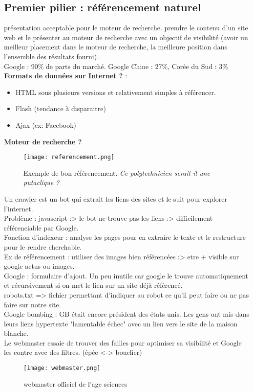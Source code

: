\documentclass[10pt,a4paper]{article}
\begin{document}
\subsection{Premier pilier : référencement naturel}
présentation acceptable pour le moteur de recherche.
prendre le contenu d'un site web et le présenter au moteur de recherche avec un objectif de visibilité (avoir un meilleur placement dans le moteur de recherche, la meilleure position dans l'ensemble des résultats fourni).\\
Google : 90\% de parts du marché. Google Chine : 27\%, Corée du Sud : 3\% \\
\textbf{Formats de données sur Internet ?} : 
\begin{itemize}
\item HTML sous plusieurs versions et relativement simples à référencer.
\item Flash (tendance à disparaitre)
\item Ajax (ex: Facebook)
\end{itemize}
\textbf{Moteur de recherche ?}
\begin{figure}[h!]
\centering
\texttt{[image: referencement.png]}
\caption{Exemple de bon référencement. \textit{Ce polytechnicien serait-il une putaclique ?}}
\end{figure}
Un crawler est un bot qui extrait les liens des sites et le suit pour explorer l'internet.\\
Problème : javascript :> le bot ne trouve pas les liens :> difficilement référenciable par Google.\\
Fonction d'indexeur : analyse les pages pour en extraire le texte et le restructure pour le rendre cherchable.\\
Ex de référencement : utiliser des images bien référencées :> etre + visible sur google actus ou images.\\
Google : formulaire d'ajout. Un peu inutile car google le trouve automatiquement et récursivement si on met le lien sur un site déjà référencé. \\
robots.txt => fichier permettant d'indiquer au robot ce qu'il peut faire ou ne pas faire sur notre site.
\\Google bombing : GB était encore président des états unis. Les gens ont mis dans leurs liens hypertexte "lamentable échec" avec un lien vers le site de la maison blanche. \\
Le webmaster essaie de trouver des failles pour optimiser sa visibilité et Google les contre avec des filtres. (épée <-> bouclier)
\begin{figure}[h!]
\centering
\texttt{[image: webmaster.png]}
\caption{webmaster officiel de l'age sciences}
\end{figure}
\end{document}
